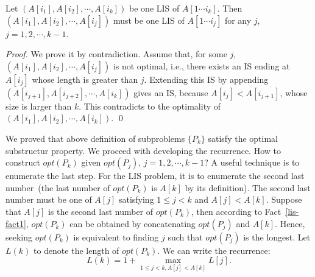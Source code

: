 \begin{fact}\label{lis-fact1}
Let $(A[i_1], A[i_2], \cdots, A[i_k])$ be one LIS of $A[1\cdots i_k]$.
Then  $(A[i_1], A[i_2], \cdots, A[i_j])$ must be one LIS of $A[1\cdots i_j]$
for any $j$, $j=1, 2, \cdots, k-1$.
\end{fact}
\emph{Proof.} We prove it by contradiction. Assume that, for some $j$, 
$(A[i_1], A[i_2], \cdots, A[i_j])$ is not optimal, i.e.,
there exists an IS ending at $A[i_j]$ whose length is greater than $j$.
Extending this IS by appending $(A[i_{j+1}], A[i_{j+2}], \cdots, A[i_k])$
gives an IS, because $A[i_j] < A[i_{j+1}]$, whose size is larger than $k$.
This contradicts to the optimality of $(A[i_1], A[i_2], \cdots, A[i_k])$. \qed

We proved that above definition of subproblems $\{P_k\}$ satisfy the optimal substructur property.
We proceed with developing the recurrence.
%
%
How to construct $opt(P_k)$ given $opt(P_j)$, $j = 1, 2, \cdots, k-1$?
A useful technique is to enumerate the last step.
For the LIS problem, it is to enumerate the second last number~(the last number of $opt(P_k)$ is $A[k]$ by its definition).
The second last number must be one of $A[j]$ satisfying $1\le j < k$ and $A[j] < A[k]$.
Suppose that $A[j]$ is the second last number of $opt(P_k)$, then according to Fact~\ref{lis-fact1},
$opt(P_k)$ can be obtained by concatenating $opt(P_j)$ and $A[k]$.
Hence, seeking $opt(P_k)$ is equivalent to finding $j$ such that $opt(P_j)$ is the longest. 
Let $L(k)$ to denote the length of $opt(P_k)$. We can write the recurrence:
$$\textstyle L(k) = 1 + \max_{1 \le j < k, A[j] < A[k]} L[j].$$

